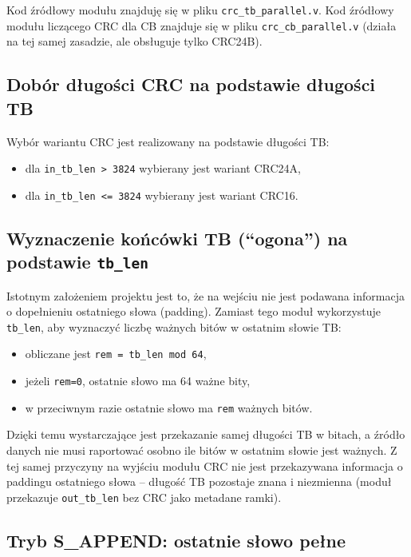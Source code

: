 Kod źródłowy modułu znajduję się w pliku \texttt{crc\_tb\_parallel.v}. Kod źródłowy modułu liczącego CRC dla CB znajduje się w pliku \texttt{crc\_cb\_parallel.v} (działa na tej samej zasadzie, ale obsługuje tylko CRC24B).

\subsection{Dobór długości CRC na podstawie długości TB}
\label{subsec:crc_len_select}

Wybór wariantu CRC jest realizowany na podstawie długości TB:
\begin{itemize}
    \item dla \texttt{in\_tb\_len > 3824} wybierany jest wariant CRC24A,
    \item dla \texttt{in\_tb\_len <= 3824} wybierany jest wariant CRC16.
\end{itemize}

\subsection{Wyznaczenie końcówki TB (``ogona'') na podstawie \texttt{tb\_len}}
\label{subsec:tail_calc}

Istotnym założeniem projektu jest to, że na wejściu nie jest podawana informacja o dopełnieniu ostatniego słowa (padding). Zamiast tego moduł wykorzystuje \texttt{tb\_len}, aby wyznaczyć liczbę ważnych bitów w ostatnim słowie TB:
\begin{itemize}
    \item obliczane jest \texttt{rem = tb\_len mod 64},
    \item jeżeli \texttt{rem=0}, ostatnie słowo ma 64 ważne bity,
    \item w przeciwnym razie ostatnie słowo ma \texttt{rem} ważnych bitów.
\end{itemize}

Dzięki temu wystarczające jest przekazanie samej długości TB w bitach, a źródło danych nie musi raportować osobno ile bitów w ostatnim słowie jest ważnych. Z tej samej przyczyny na wyjściu modułu CRC nie jest przekazywana informacja o paddingu ostatniego słowa -- długość TB pozostaje znana i niezmienna (moduł przekazuje \texttt{out\_tb\_len} bez CRC jako metadane ramki).

\subsection{Tryb S\_APPEND: ostatnie słowo pełne}
\label{subsec:append_mode}

